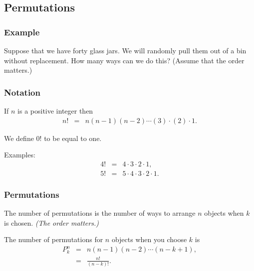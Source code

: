 \subsection{Permutations}

\begin{frame}
  \frametitle{Example}
  Suppose that we have forty glass jars. We will randomly pull them
  out of a bin without replacement. How many ways can we do this?
  (Assume that the order matters.)
  \vfill


\end{frame}

\begin{frame}
  \frametitle{Notation}

  \begin{definition}[Factorials]

    If $n$ is a positive integer then
    \begin{eqnarray}
      n! & = & n(n-1)(n-2)\cdots (3) \cdot (2) \cdot 1.
    \end{eqnarray}

    We define $0!$ to be equal to one.    
  \end{definition}

  Examples:
  \begin{eqnarray}
    4! & = & 4 \cdot 3  \cdot 2 \cdot 1, \\
    5! & = & 5 \cdot 4 \cdot 3  \cdot 2 \cdot 1.
  \end{eqnarray}
  
\end{frame}



\begin{frame}
  \frametitle{Permutations}

  \begin{definition}[Permutations]
    The number of permutations is the number of ways to arrange $n$
    objects when $k$ is chosen. \textit{(The order matters.)}
  \end{definition}

  \begin{definition}[Notation]
    The number of permutations for $n$ objects when you choose $k$
    is 
    \begin{eqnarray*}
      {P}_k^{n} & = & n(n-1)(n-2)\cdots(n-k+1), \\
                            & = & \frac{n!}{(n-k)!}.
    \end{eqnarray*}
  \end{definition}

\end{frame}

